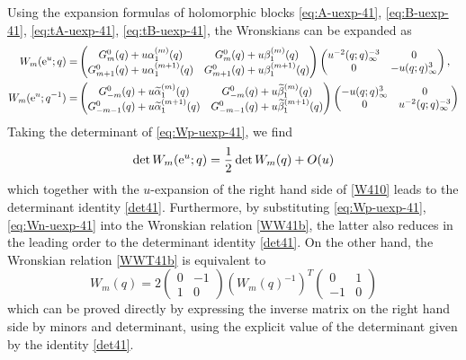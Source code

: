 \documentclass[12pt,reqno]{amsart}
\theoremstyle{definition}
\def\-{\,-\,}
\def\wt{\widetilde}
\def\re{{\rm e}}
\begin{document}
Using the expansion formulas of holomorphic blocks \eqref{eq:A-uexp-41},
\eqref{eq:B-uexp-41}, \eqref{eq:tA-uexp-41}, \eqref{eq:tB-uexp-41},
the Wronskians can be expanded as
\begin{align}
  W_m(\re^u;q) =
  &\begin{pmatrix}
    G_m^0(q)+u\alpha_1^{(m)}(q)&G_m^0(q)+u\beta_1^{(m)}(q)\\
    G_{m+1}^0(q)+u\alpha_1^{(m+1)}(q)&G_{m+1}^0(q)+u\beta_1^{(m+1)}(q)
  \end{pmatrix}
  \begin{pmatrix}
    u^{-2}(q;q)_\infty^{-3}&0\\
    0&-u(q;q)_\infty^3
  \end{pmatrix},
  \label{eq:Wp-uexp-41}\\
  W_m(\re^u;q^{-1}) =
  &\begin{pmatrix}
    G_{-m}^0(q)+u\wt{\alpha}_1^{(m)}(q)
    &G_{-m}^0(q)+u\wt{\beta}_1^{(m)}(q)\\
    G_{-m-1}^0(q)+u\wt{\alpha}_1^{(m+1)}(q)
    &G_{-m-1}^0(q)+u\wt{\beta}_1^{(m+1)}(q)
  \end{pmatrix}
  \begin{pmatrix}
    -u(q;q)_\infty^{3}&0\\
    0&u^{-2}(q;q)_\infty^{-3}
  \end{pmatrix}
  \label{eq:Wn-uexp-41}
\end{align}
Taking the determinant of \eqref{eq:Wp-uexp-41}, we find
\begin{equation}
  \det W_m(\re^u;q) = \frac{1}{2} \det W_m(q) + O(u)
\end{equation}
which together with the $u$-expansion of the right hand side of
\eqref{W410} leads to the determinant identity \eqref{det41}.
Furthermore, by substituting \eqref{eq:Wp-uexp-41},
\eqref{eq:Wn-uexp-41} into the Wronskian relation \eqref{WW41b}, the
latter also reduces in the leading order to the determinant identity
\eqref{det41}.  On the other hand, the Wronskian relation
\eqref{WWT41b} is equivalent to
\begin{equation}
  W_m(q) = 2
  \begin{pmatrix}
    0&-1\\1&0
  \end{pmatrix}\left(W_m(q)^{-1}\right)^T
  \begin{pmatrix}
    0&1\\-1&0
  \end{pmatrix}
\end{equation}
which can be proved directly by expressing the inverse matrix on the
right hand side by minors and determinant, using the explicit value of
the determinant given by the identity \eqref{det41}.
\end{document}
